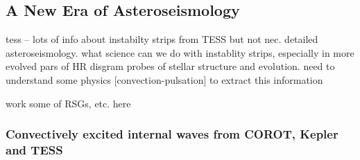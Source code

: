 {\color{blue}
\subsection{A New Era of Asteroseismology}




tess -- lots of info about instabilty strips from TESS but not nec. detailed asteroseismology.  what science can we do with instablity strips, especially in more evolved pars of HR disgram  probes of stellar structure and evolution.   need to understand some physics [convection-pulsation] to extract this information

work some of RSGs, etc. here

\subsubsection{Convectively excited internal waves from COROT, Kepler and TESS}


}